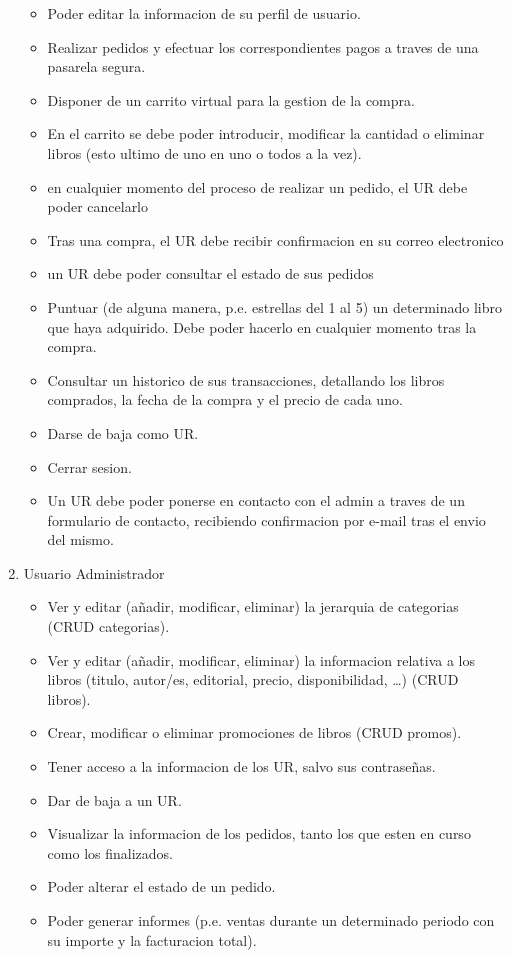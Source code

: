\documentclass[a4paper,11pt]{report}
\begin{document}
\begin{enumerate}
        \begin{itemize}
            \item Poder editar la informacion de su perfil de usuario.
            \item Realizar pedidos y efectuar los correspondientes pagos a traves de una pasarela segura.
            \item  Disponer de un carrito virtual para la gestion de la compra.
            \item En el carrito se debe poder introducir, modificar la cantidad o eliminar libros (esto ultimo de uno en uno o todos a la vez).
            \item en cualquier momento del proceso de realizar un pedido, el UR debe poder cancelarlo
            \item Tras una compra, el UR debe recibir confirmacion en su correo electronico
            \item un UR debe poder consultar el estado de sus pedidos
            \item Puntuar (de alguna manera, p.e. estrellas del 1 al 5) un determinado libro que haya adquirido. Debe poder hacerlo en cualquier momento tras la compra.
            \item Consultar un historico de sus transacciones, detallando los libros comprados, la fecha de la compra y el precio de cada uno.
            \item Darse de baja como UR.
            \item Cerrar sesion.
            \item Un UR debe poder ponerse en contacto con el admin a traves de un formulario de contacto, recibiendo confirmacion por e-mail tras el envio del mismo.
        \end{itemize}
        \item Usuario Administrador
        \begin{itemize}
            \item Ver y editar (a\~nadir, modificar, eliminar) la jerarquia de categorias (CRUD categorias).
            \item Ver y editar (a\~nadir, modificar, eliminar) la informacion relativa a los libros (titulo, autor/es, editorial, precio, disponibilidad, \ldots) (CRUD libros).
            \item Crear, modificar o eliminar promociones de libros (CRUD promos).
            \item Tener acceso a la informacion de los UR, salvo sus contrase\~nas.
            \item Dar de baja a un UR.
            \item Visualizar la informacion de los pedidos, tanto los que esten en curso como los finalizados.
            \item Poder alterar el estado de un pedido.
            \item Poder generar informes (p.e. ventas durante un determinado periodo con su importe y la facturacion total).
        \end{itemize}
    \end{enumerate}
\end{document}
